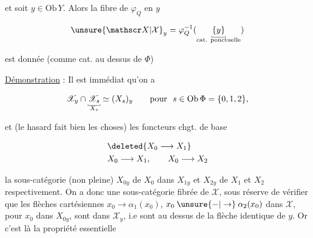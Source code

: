 et soit $y\in\mathrm{Ob}\,Y$. Alors la fibre de $\varphi_Q$ en $y$

\[
\unsure{\mathscr X|\mathcal X}_y=\varphi_Q^{-1}(\underset{\substack{\rule{.35pt}{.4ex}\rule{1.6em}{.35pt}\rule{.35pt}{.4ex}\\[-.2ex]\text{cat. ponctuelle}}}{\{y\}})
\]

est donnée  (comme cat. au dessus de $\Phi$)


\uline{Démonstration} : Il est immédiat qu'on a

\[
\mathscr X_y\cap\underset{\substack{\rule{.35pt}{.4ex}\rule{1.4em}{.35pt}\rule{.35pt}{.4ex}\\[-.2ex]X_s}}{\mathscr X_s}\simeq(X_s)_y\qquad\text{pour }\ s\in\mathrm{Ob}\,\Phi=\{0,1,2\},
\]


et (le hasard fait bien les choses) les foncteurs chgt. de base

\[
\begin{aligned}
&\deleted{X_0\longrightarrow X_1}\\
&X_0\longrightarrow X_1,\qquad X_0\longrightarrow X_2
\end{aligned}
\]

  la sous-catégorie (non pleine) $X_{0y}$ de $X_0$ dans  $X_{1y}$ et  $X_{2y}$ de $X_1$ et $X_2$ respectivement. On a donc une sous-catégorie fibrée de $\mathscr X$, sous réserve de vérifier que les flèches  cartésiennes $x_0\longrightarrow\alpha_1(x_0)$, $x_0\mathbin{\unsure{-|\to}}\alpha_2(x_0)$ dans $\mathscr X$,  pour $x_0$ dans $X_{0y}$, sont dans $\mathscr X_y$, i.e sont au dessus de la flèche identique de $y$. Or c'est là la propriété essentielle
